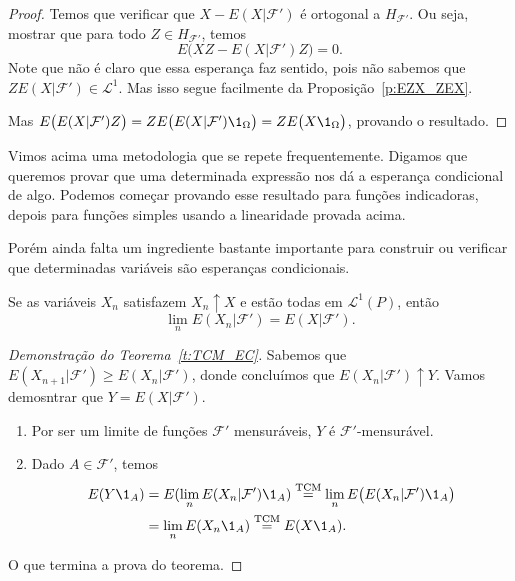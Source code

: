\begin{proof}
  Temos que verificar que $X - E(X|\mathcal{F}')$ é ortogonal a $H_{\mathcal{F}'}$.
  Ou seja, mostrar que para todo $Z \in H_{\mathcal{F}'}$, temos
  \begin{equation}
    E\big( XZ - E(X|\mathcal{F}') Z \big) = 0.
  \end{equation}
  Note que não é claro que essa esperança faz sentido, pois não sabemos que $ZE(X|\mathcal{F}') \in \mathcal{L}^1$.
  Mas isso segue facilmente da Proposição~\ref{p:EZX_ZEX}.

  Mas $E\big( E(X|\mathcal{F}') Z \big) = Z E\big( E(X | \mathcal{F}') \1_\Omega \big) = Z E\big( X \1_\Omega \big)$, provando o resultado.
\end{proof}

Vimos acima uma metodologia que se repete frequentemente.
Digamos que queremos provar que uma determinada expressão nos dá a esperança condicional de algo.
Podemos começar provando esse resultado para funções indicadoras, depois para funções simples usando a linearidade provada acima.

Porém ainda falta um ingrediente bastante importante para construir ou verificar que determinadas variáveis são esperanças condicionais.

\begin{theorem}
  \label{t:TCM_EC}
  Se as variáveis $X_n$ satisfazem $X_n \uparrow X$ e estão todas em $\mathcal{L}^1(P)$, então
  \begin{equation}
    \lim_n E(X_n|\mathcal{F}') = E(X|\mathcal{F}').
  \end{equation}
\end{theorem}

\begin{proof}[Demonstração do Teorema~\ref{t:TCM_EC}]
  Sabemos que $E(X_{n+1} | \mathcal{F}') \geq E(X_n|\mathcal{F}')$, donde concluímos que $E(X_n|\mathcal{F}') \uparrow Y$.
  Vamos demosntrar que $Y = E(X|\mathcal{F}')$.
  \begin{enumerate}[\quad a)]
  \item Por ser um limite de funções $\mathcal{F}'$ mensuráveis, $Y$ é $\mathcal{F}'$-mensurável.
  \item Dado $A \in \mathcal{F}'$, temos
    \begin{equation}
      \begin{split}
        E(Y \1_A) & = E(\lim_n E(X_n |\mathcal{F}') \1_A) \overset{\text{TCM}}= \lim_n E\big( E(X_n|\mathcal{F}') \1_A \big)\\
        & = \lim_n E(X_n \1_A) \overset{\text{TCM}}= E(X \1_A).
      \end{split}
    \end{equation}
  \end{enumerate}
  O que termina a prova do teorema.
\end{proof}

